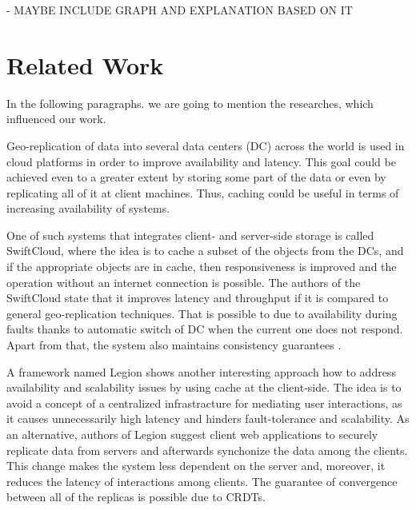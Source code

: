 - MAYBE INCLUDE GRAPH AND EXPLANATION BASED ON IT

\section{Related Work}

In the following paragraphs. we are going to mention the researches, which influenced our work.

Geo-replication of data into several data centers (DC) across the world is used in cloud platforms in order to improve availability and latency\cite{6}. This goal could be achieved even to a greater extent by storing some part of the data or even by replicating all of it at client machines. Thus, caching could be useful in terms of increasing availability of systems.

One of such systems that integrates client- and server-side storage is called SwiftCloud, where the idea is to cache a subset of the objects from the DCs, and if the appropriate objects are in cache, then responsiveness is improved and the operation without an internet connection is possible\cite{5}. The authors of the SwiftCloud state that it improves latency and throughput if it is compared to general geo-replication techniques. That is possible to due to availability during faults thanks to automatic switch of DC when the current one does not respond. Apart from that, the system also maintains consistency guarantees \cite{7}.

A framework named Legion shows another interesting approach how to address availability and scalability issues by using cache at the client-side. The idea is to avoid a concept of a centralized infrastracture for mediating user interactions, as it causes unnecessarily high latency and hinders fault-tolerance and scalability\cite{8}. As an alternative, authors of Legion suggest client web applications to securely replicate data from servers and afterwards synchonize the data among the clients. This change makes the system less dependent on the server and, moreover, it reduces the latency of interactions among clients. The guarantee of convergence between all of the replicas is possible due to CRDTs. 